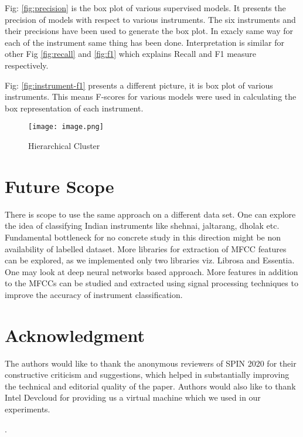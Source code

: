 \documentclass[conference]{IEEEtran}
\begin{document}
Fig: \ref{fig:precision} is the box plot of various supervised models. It presents the precision of models with respect to  various instruments. The six instruments and their precisions have been used to generate the box plot. In exacly same way for each of the instrument same thing has been done. Interpretation is similar for other Fig \ref{fig:recall} and \ref{fig:f1} which explains Recall and F1 measure respectively.


Fig: \ref{fig:instrument-f1} presents a different picture, it is box plot of various instruments. This means F-scores for various models were used in calculating the box representation of each instrument. 

\begin{figure}[h!]
	\centering
	\texttt{[image: image.png]}
	\caption{Hierarchical Cluster}
	\label{fig:hc}
\end{figure}


\section{Future Scope}\label{end}
There is scope to use the same approach on a different data set. One can explore the idea of classifying Indian instruments like shehnai, jaltarang, dholak etc. Fundamental bottleneck for no concrete study in this direction might be non availability of labelled dataset. More libraries for extraction of MFCC features can be explored, as we implemented only two libraries viz. Librosa and Essentia. One may look at deep neural networks based approach. More features in addition to the MFCCs can be studied and extracted using signal processing techniques to improve the accuracy of instrument classification.


\section*{Acknowledgment}
The authors would like to thank the anonymous reviewers of SPIN 2020 for their constructive criticism and suggestions, which helped in substantially improving the technical and editorial quality of the paper. Authors would also like to thank Intel Devcloud for providing us a virtual machine
which we used in our experiments.


. \balance 
	
\end{document}
